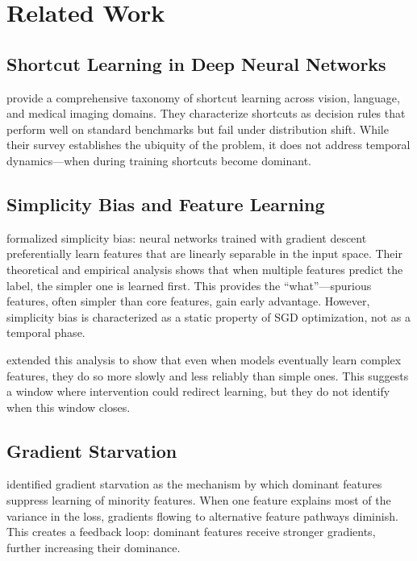 \section{Related Work}

\subsection{Shortcut Learning in Deep Neural Networks}

\citet{geirhos2020shortcut} provide a comprehensive taxonomy of shortcut learning across vision, language, and medical imaging domains. They characterize shortcuts as decision rules that perform well on standard benchmarks but fail under distribution shift. While their survey establishes the ubiquity of the problem, it does not address temporal dynamics---when during training shortcuts become dominant.

\subsection{Simplicity Bias and Feature Learning}

\citet{shah2020simplicity} formalized simplicity bias: neural networks trained with gradient descent preferentially learn features that are linearly separable in the input space. Their theoretical and empirical analysis shows that when multiple features predict the label, the simpler one is learned first. This provides the ``what''---spurious features, often simpler than core features, gain early advantage. However, simplicity bias is characterized as a static property of SGD optimization, not as a temporal phase.

\citet{hermann2020shapes} extended this analysis to show that even when models eventually learn complex features, they do so more slowly and less reliably than simple ones. This suggests a window where intervention could redirect learning, but they do not identify when this window closes.

\subsection{Gradient Starvation}

\citet{pezeshki2021gradient} identified gradient starvation as the mechanism by which dominant features suppress learning of minority features. When one feature explains most of the variance in the loss, gradients flowing to alternative feature pathways diminish. This creates a feedback loop: dominant features receive stronger gradients, further increasing their dominance.

